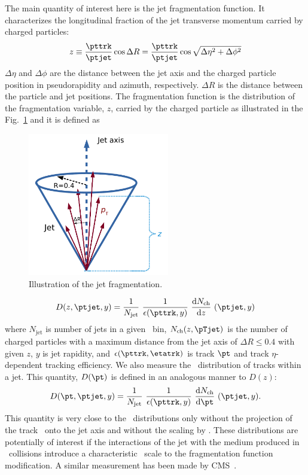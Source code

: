   The main quantity of interest here is the jet fragmentation function. It characterizes the longitudinal fraction
  of the jet transverse momentum carried by charged particles:
    \begin{equation}
  z \equiv   \frac{\pttrk}{\ptjet} \cos \Delta R  
  = \frac{\pttrk}{\ptjet} \cos {\sqrt{\Delta \eta^2 + \Delta \phi^2}}
  \label{formula:z}
    \end{equation}
  $\Delta \eta$ and $\Delta \phi$ are the distance between the jet axis and the charged particle position in
  pseudorapidity and azimuth, respectively.
  $\Delta R$ is the distance between the particle and jet positions.
The fragmentation function is the distribution of the fragmentation variable, $z$, carried by the charged particle as illustrated in the Fig.~\ref{Fig:zdef} and it is defined as  

\begin{figure}
\centerline{
\includegraphics[width=0.55\textwidth]{figures_general/fragScheme_v2.pdf}
}
\caption{
Illustration of the jet fragmentation.    
  }
\label{Fig:zdef}
\end{figure}

\begin{equation}
D(z,\ptjet,y) = \frac{1}{N_{\mathrm{jet}}} ~ \frac{1}{\epsilon(\pttrk ,y)} ~ \frac{\mathrm{d} N_{\mathrm{ch}}}{\mathrm{d} z}~(\ptjet,y)
\end{equation}
where $N_{\mathrm{jet}}$ is number of jets in a given \ptjet\ bin, $N_{\mathrm{ch}}(z,\pTjet)$ is the number of charged particles with a maximum distance from the jet axis of $\Delta R \leq 0.4$ with given $z$, $y$ is jet rapidity, and $\epsilon(\pttrk ,\etatrk)$ is track $\pt$ and track $\eta$-dependent tracking efficiency. 
We also measure the \pt\ distribution of tracks within a jet.  This quantity, $D(\pt )$ is defined in
an analogous manner to $D(z )$:
\begin{equation}
D(\pt,\ptjet,y) = \frac{1}{N_{\mathrm{jet}}} ~ \frac{1}{\epsilon(\pttrk ,y)} ~ \frac{\mathrm{d} N_{\mathrm{ch}}}{\mathrm{d} \pt}~(\ptjet,y).
\end{equation}
This quantity is very close to the \Dz\ distributions only without the projection of the track \pt\ onto the jet axis and without the
scaling by \ptjet.
These distributions are potentially of interest if the interactions of the jet with the medium produced in \pbpb\ 
collisions introduce a characteristic \pt\ scale to the fragmentation function modification.  A similar measurement
has been made by CMS~\cite{Chatrchyan:2014ava}.



